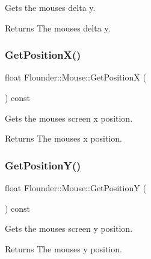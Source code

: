 Gets the mouses delta y. 

\begin{DoxyReturn}{Returns}
The mouses delta y. 
\end{DoxyReturn}
\mbox{\label{class_flounder_1_1_mouse_aad43f3b799a64366d4c2fef5611baa57}} 
\subsubsection{\texorpdfstring{Get\+Position\+X()}{GetPositionX()}}
{\footnotesize\ttfamily float Flounder\+::\+Mouse\+::\+Get\+PositionX (\begin{DoxyParamCaption}{ }\end{DoxyParamCaption}) const\hspace{0.3cm}{\ttfamily [inline]}}



Gets the mouses screen x position. 

\begin{DoxyReturn}{Returns}
The mouses x position. 
\end{DoxyReturn}
\mbox{\label{class_flounder_1_1_mouse_a84d449542d380977229d3db7ecea8a07}} 
\subsubsection{\texorpdfstring{Get\+Position\+Y()}{GetPositionY()}}
{\footnotesize\ttfamily float Flounder\+::\+Mouse\+::\+Get\+PositionY (\begin{DoxyParamCaption}{ }\end{DoxyParamCaption}) const\hspace{0.3cm}{\ttfamily [inline]}}



Gets the mouses screen y position. 

\begin{DoxyReturn}{Returns}
The mouses y position. 
\end{DoxyReturn}
\mbox{\label{class_flounder_1_1_mouse_a381401976185ff9dbd46cb5ac9509a59}} 
